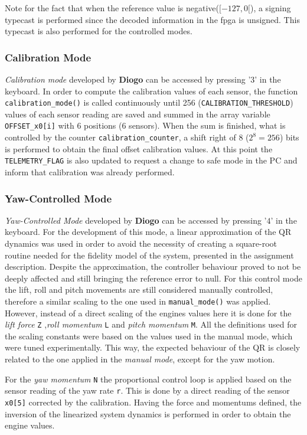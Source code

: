 \documentclass{article}
\begin{document}
Note for the fact that when the reference value is negative($[-127,0[$), a signing typecast is performed since the decoded information in the fpga is unsigned. This typecast is also performed for the controlled modes.

\subsubsection{Calibration Mode}
\textit{Calibration mode} developed by \textbf{Diogo} can be accessed by pressing '$3$' in the keyboard. In order to compute the calibration values of each sensor, the function \texttt{calibration\_mode()} is called continuously until 256 (\texttt{CALIBRATION\_THRESHOLD}) values of each sensor reading are saved and summed in the array variable \texttt{OFFSET\_x0[i]} with 6 positions (6 sensors). When the sum is finished, what is controlled by the counter \texttt{calibration\_counter}, a shift right of $8$ ($2^8=256$) bits is performed to obtain the final offset calibration values. At this point the \texttt{TELEMETRY\_FLAG} is also updated to request a change to safe mode in the PC and inform that calibration was already performed.

\subsubsection{Yaw-Controlled Mode}
\textit{Yaw-Controlled Mode} developed by \textbf{Diogo} can be accessed by pressing '$4$' in the keyboard. For the development of this mode, a linear approximation of the QR dynamics was used in order to avoid the necessity of creating a square-root routine needed for the fidelity model of the system, presented in the assignment description. Despite the approximation, the controller behaviour proved to not be deeply affected and still bringing the reference error to null.
For this control mode the lift, roll and pitch movements are still considered manually controlled, therefore a similar scaling to the one used in \texttt{manual\_mode()} was applied. However, instead of a direct scaling of the engines values here it is done for the \textit{lift force} \texttt{Z} ,\textit{roll momentum} \texttt{L} and \textit{pitch momentum} \texttt{M}. All the definitions used for the scaling constants were based on the values used in the manual mode, which were tuned experimentally. This way, the expected behaviour of the QR is closely related to the one applied in the \textit{manual mode}, except for the yaw motion.

For the \textit{yaw momentum} \texttt{N} the proportional control loop is applied based on the sensor reading of the yaw rate \texttt{r}. This is done by a direct reading of the sensor \texttt{x0[5]} corrected by the calibration. Having the force and momentums defined, the inversion of the linearized system dynamics is performed in order to obtain the engine values. 
\end{document}
